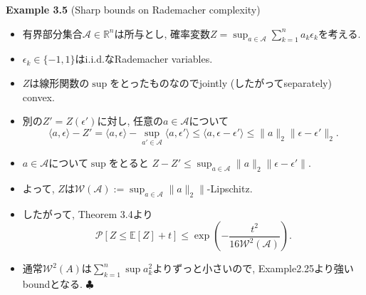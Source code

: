 \documentclass[aspectratio=169, dvipdfmx]{beamer}
\def\endexample{\hfill $\clubsuit$}
\newcommand{\ex}{\mathbb{E}}
\begin{document}
\begin{frame}{}{}
{\bf Example 3.5} (Sharp bounds on Rademacher complexity)
    \begin{itemize}
        \item 有界部分集合$\mathcal{A}\in\mathbb{R}^n$は所与とし,
        確率変数$Z = \sup_{a\in\mathcal{A}}\sum_{k=1}^na_k\epsilon_k$を考える.
        \item $\epsilon_k \in \{ -1,1\}$はi.i.d.なRademacher variables.
        \item $Z$は線形関数の$\sup$をとったものなのでjointly (したがってseparately) convex.
        \item 別の$Z' = Z(\epsilon')$に対し, 任意の$a\in\mathcal{A}$について
        \[
            \langle a,\epsilon\rangle - Z'
            = \langle a,\epsilon\rangle - \sup_{a'\in\mathcal{A}}\langle a,\epsilon'\rangle
            \le \langle a, \epsilon-\epsilon'\rangle
            \le \|a\|_2 \|\epsilon-\epsilon'\|_2.
        \]
        \item $a\in \mathcal{A}$について$\sup$をとると
        $Z-Z' \le \sup_{a\in\mathcal{A}}\|a\|_2\|\epsilon-\epsilon'\|$.
        \item よって, $Z$は$\mathcal{W}(\mathcal{A}):=\sup_{a\in\mathcal{A}}\|a\|_2\|$-Lipschitz.
        \item したがって, Theorem 3.4より
        \[ \mathcal{P}[Z \le \ex[Z]+t] \le \exp\left(-\frac{t^2}{16\mathcal{W}^2(\mathcal{A})}\right).
        \tag{3.17}\label{3.17}\]
        \item 通常$\mathcal{W}^2(A)$は$\sum_{k=1}^n\sup a_k^2$よりずっと小さいので, Example2.25より強いboundとなる.
        \endexample
    \end{itemize}
\end{frame}
\end{document}
